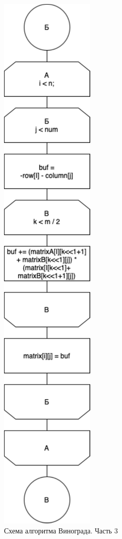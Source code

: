 \begin{figure}[h]
    \centering
    \includegraphics[width=0.24\linewidth]{img/WinogradOptC.pdf}
    \caption{Схема алгоритма Винограда. Часть 3}
    \label{fig:WinogradOptC}
\end{figure}

